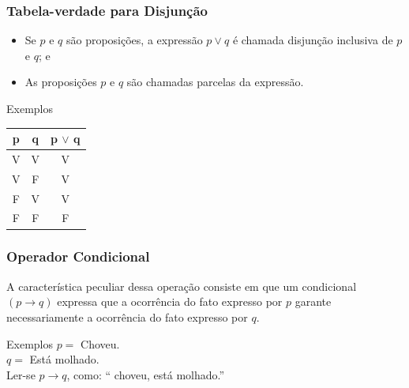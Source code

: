 \documentclass{beamer}
\begin{document}
\begin{frame}
\frametitle{Tabela-verdade para Disjunção}

\begin{itemize}
\item Se $p$ e $q$ são proposições, a expressão $p \vee q$ é chamada disjunção inclusiva de $p$ e $q$; e
\item As proposições $p$ e $q$ são chamadas parcelas da expressão.
\end{itemize} \vfill

\begin{exampleblock}{Exemplos}
\center
\begin{tabular}{|c|c|c|}
	\hline
	\textbf{p} & \textbf{q} & \textbf{p $\vee$ q}\\ \hline
	V & V & V \\ \hline
	V & F & V \\ \hline
	F & V & V \\ \hline
	F & F & F \\ \hline
\end{tabular}
\end{exampleblock}
\end{frame}

\begin{frame}
\frametitle{Operador Condicional}

A característica peculiar dessa operação consiste em que um condicional $(p \rightarrow q)$ expressa que a ocorrência do fato expresso por $p$ garante necessariamente a ocorrência do fato expresso por $q$. \vfill

\begin{exampleblock}{Exemplos}
$p =$ Choveu.\\
$q =$ Está molhado.\\
Ler-se $p \rightarrow q$, como: `` choveu,  está molhado.''
\end{exampleblock}
\end{frame}
\end{document}

